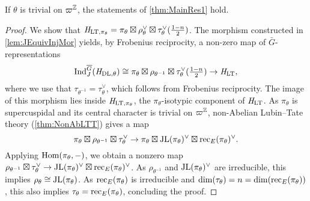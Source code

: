 \documentclass[../main.tex]{subfiles}
\begin{document}
\begin{lem}\label{lem:FirstCaseOfMainRes1}
  If $\theta$ is trivial on $\varpi^{\mathbb{Z}}$, the statements of 
  \cref{thm:MainRes1} hold.   
\begin{proof}
  We show that $\mathit H_{\mathrm{LT},\pi_\theta} = \pi_\theta \boxtimes \rho_\theta^\vee 
  \boxtimes \tau_\theta^{\vee}(\tfrac{1-n}2)$. 
  The morphism constructed in \cref{lem:JEquivInjMor} yields, by Frobenius
  reciprocity, a non-zero map of ${\bar G}$-representations
  \begin{equation} \label{eq:WantedMap}
    \operatorname{Ind}_{J}^{\overline G} (\mathit H_{\mathrm{DL},\theta}) \cong \pi_\theta \boxtimes \rho_{\theta^{-1}}
    \boxtimes \tau_\theta^\vee (\tfrac{1-n}2) \to \mathit H_{\mathrm{LT}},
  \end{equation}
  where we use that $\tau_{\theta^{-1}} = \tau_\theta^\vee$, which follows from 
  Frobenius reciprocity. The image of this morphism lies inside $\mathit H_{\mathrm{LT},
  \pi_\theta}$, the $\pi_\theta$-isotypic component of $\mathit H_{\mathrm{LT}}$. 
  As $\pi_\theta$ is supercuspidal and its central character is trivial on 
  $\varpi^{\mathbb{Z}}$, non-Abelian Lubin--Tate theory (\cref{thm:NonAbLTT}) gives 
  a map 
  \begin{equation*}
    \pi_\theta \boxtimes \rho_{\theta^{-1}} \boxtimes \tau_\theta^{\vee} \to
    \pi_\theta \boxtimes \mathrm{JL}(\pi_\theta)^\vee \boxtimes
    \mathrm{rec}_E(\pi_\theta)^\vee.
  \end{equation*}
  Applying $\operatorname{Hom}(\pi_\theta, -)$, we obtain a nonzero map $\rho_{\theta^{-1}} \boxtimes \tau_\theta^{\vee} \to \mathrm{JL}(\pi_\theta)^\vee
  \boxtimes \mathrm{rec}_E(\pi_\theta)^\vee$.
  As $\rho_{\theta^{-1}}$ and $\mathrm{JL}(\pi_\theta)^\vee$ are irreducible, this 
  implies $\rho_\theta \cong \mathrm{JL}(\pi_\theta)$.
  As $\mathrm{rec}_E(\pi_\theta)$ is irreducible and $\dim(\tau_\theta) = n = \dim
  (\mathrm{rec}_E(\pi_\theta))$, this also implies $\tau_\theta = \mathrm{rec}_E(\pi_\theta)$,
  concluding the proof.
\end{proof}
\end{lem}
\end{document}
